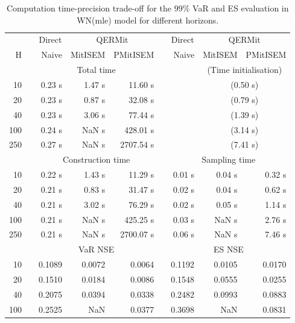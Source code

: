 \footnotesize{  
{ \renewcommand{\arraystretch}{1.3} 
\begin{longtable}{rr rrr r rrr}  
\caption{Computation time-precision trade-off for the  $99\%$ VaR and ES evaluation in WN(mle) model for different horizons.} 
\label{tab:time_precision_WN_ML} \\ 
 & & \multicolumn{1}{c}{Direct} & \multicolumn{2}{c}{QERMit}&  & \multicolumn{1}{c}{Direct} & \multicolumn{2}{c}{QERMit} \\ \cline{3-5} \cline{7-9} 
 H & & Naive & MitISEM & PMitISEM & & Naive & MitISEM & PMitISEM \\ \hline 
 & & \multicolumn{3}{c}{Total time} & & & \multicolumn{2}{c}{(Time initialisation)}  \\ \cline{3-5} \cline{8-9}
10 & & 0.23 s & 1.47 s & 11.60 s &&& \multicolumn{2}{c}{(0.50 s)} \\ 
20 & & 0.23 s & 0.87 s & 32.08 s &&& \multicolumn{2}{c}{(0.79 s)} \\ 
40 & & 0.23 s & 3.06 s & 77.44 s &&& \multicolumn{2}{c}{(1.39 s)} \\ 
100 & & 0.24 s &  NaN s & 428.01 s &&& \multicolumn{2}{c}{(3.14 s)} \\ 
250 & & 0.27 s &  NaN s & 2707.54 s &&& \multicolumn{2}{c}{(7.41 s)} \\ 
\hline 
 & & \multicolumn{3}{c}{Construction time} & & \multicolumn{3}{c}{ Sampling time} \\ \cline{3-5}  \cline{7-9}
10 & & 0.22 s & 1.43 s & 11.29 s &&  0.01 s & 0.04 s & 0.32 s \\ 
20 & & 0.21 s & 0.83 s & 31.47 s &&  0.02 s & 0.04 s & 0.62 s \\ 
40 & & 0.21 s & 3.02 s & 76.29 s &&  0.02 s & 0.05 s & 1.14 s \\ 
100 & & 0.21 s &  NaN s & 425.25 s &&  0.03 s &  NaN s & 2.76 s \\ 
250 & & 0.21 s &  NaN s & 2700.07 s &&  0.06 s &  NaN s & 7.46 s \\ 
\hline 
 & & \multicolumn{3}{c}{VaR NSE} &&  \multicolumn{3}{c}{ES NSE} \\ \cline{3-5}  \cline{7-9}
10 && 0.1089  & 0.0072  & 0.0064 && 0.1192  & 0.0105  & 0.0170  \\ 
20 && 0.1510  & 0.0184  & 0.0086 && 0.1548  & 0.0555  & 0.0255  \\ 
40 && 0.2075  & 0.0394  & 0.0338 && 0.2482  & 0.0993  & 0.0883  \\ 
100 && 0.2525  &    NaN  & 0.0377 && 0.3698  &    NaN  & 0.0831  \\ 

\end{longtable}}}
